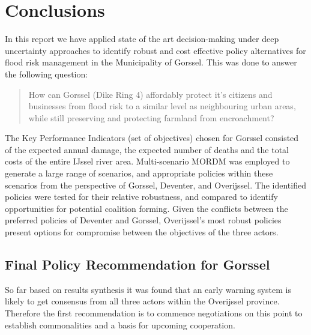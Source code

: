 \section{Conclusions}
\label{s:conc}


In this report we have applied state of the art decision-making under deep uncertainty approaches to identify robust and cost effective policy alternatives for flood risk management in the Municipality of Gorssel. This was done to answer the following question:
\begin{quote}
    How can Gorssel (Dike Ring 4) affordably protect it's citizens and businesses from flood risk to a similar level as neighbouring urban areas, while still preserving and protecting farmland from encroachment?
\end{quote} 

The Key Performance Indicators (set of objectives) chosen for Gorssel consisted of the expected annual damage, the expected number of deaths and the total costs of the entire IJssel river area. Multi-scenario MORDM was employed to generate a large range of scenarios, and appropriate policies within these scenarios from the perspective of Gorssel, Deventer, and Overijssel. The identified policies were tested for their relative robustness, and compared to identify opportunities for potential coalition forming. Given the conflicts between the preferred policies of Deventer and Gorssel, Overijssel's most robust policies present options for compromise between the objectives of the three actors.

\subsection{Final Policy Recommendation for Gorssel}
So far based on results synthesis it was found that an early warning system is likely to get consensus from all three actors within the Overijssel province. Therefore the first recommendation is to commence negotiations on this point to establish commonalities and a basis for upcoming cooperation.

